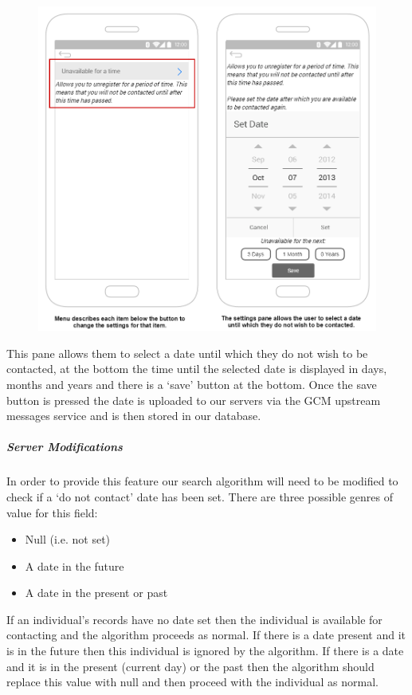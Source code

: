 \documentclass{article}
\begin{document}
	\begin{figure}[H]
		\centering
		\vspace{-20pt}
		\includegraphics[width=1\textwidth]{"Iteration5/Storyboard - Iteration 6 - 1"}
	\end{figure}
This pane allows them to select a date until which they do not wish to be contacted, at the bottom the time until the selected date is displayed in days, months and years and there is a ‘save’ button at the bottom. Once the save button is pressed the date is uploaded to our servers via the GCM upstream messages service and is then stored in our database.
\subparagraph{Server Modifications}
In order to provide this feature our search algorithm will need to be modified to check if a ‘do not contact’ date has been set. There are three possible genres of value for this field:
\begin{itemize}
\item Null (i.e. not set)
\item A date in the future
\item A date in the present or past
\end{itemize}
If an individual's records have no date set then the individual is available for contacting and the algorithm proceeds as normal. If there is a date present and it is in the future then this individual is ignored by the algorithm. If there is a date and it is in the present (current day) or the past then the algorithm should replace this value with null and then proceed with the individual as normal.\\
\end{document}
